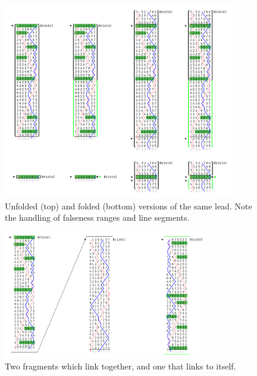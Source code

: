 \documentclass[12pt]{article}
\begin{document}
\begin{figure}[h]
    \centering
    \includegraphics[width=0.9\textwidth]{folding-full}
    \caption{Unfolded (top) and folded (bottom) versions of the same lead.  Note the handling of
    falseness ranges and line segments.}\label{fig:lead-folding}
\end{figure}

\begin{figure}
    \centering
    \includegraphics[width=0.8\textwidth]{linking-2}
    \caption{Two fragments which link together, and one that links to itself.}\label{fig:linking}
\end{figure}
\end{document}
